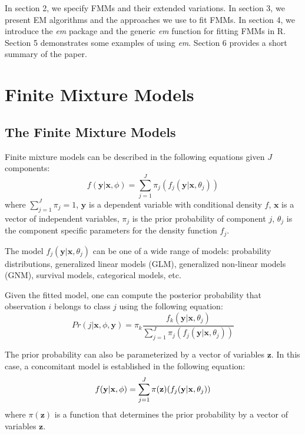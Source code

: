 \documentclass[nojss]{jss}
\begin{document}
In section 2, we specify FMMs and their extended variations. In section 3, we present EM algorithms and the approaches we use to fit FMMs. In section 4, we introduce the \emph{em} package and the generic \emph{em} function for fitting FMMs in R. Section 5 demonstrates some examples of using \emph{em}. Section 6 provides a short summary of the paper.   
   \section{Finite Mixture Models}
      \subsection{The Finite Mixture Models}
	      Finite mixture models can be described in the following equations given $J$ components:
      \begin{equation}
	      f(\mathbf{y}|\mathbf{x},\phi) = \sum_{j=1}^J \pi_j(f_j(\mathbf{y}|\mathbf{x}, \theta_j))
	    \end{equation}
	    where $\sum_{j=1}^J \pi_j = 1$,  $\mathbf{y}$ is a dependent variable with conditional density $f$,  $\mathbf{x}$ is a vector of independent variables, $\pi_j$ is the prior probability of component $j$,  $\theta_j$ is the component specific parameters for the density function $f_j$.

The model $f_j(\mathbf{y}|\mathbf{x}, \theta_j)$ can be one of a wide range of models: probability distributions, generalized linear models (GLM), generalized non-linear models (GNM),  survival models,  categorical models, etc. %

Given the fitted model, one can compute the posterior probability that observation $i$ belongs to class $j$ using the following equation:
\begin{equation}
    Pr(j|\mathbf{x}, \phi, \mathbf{y}) = \pi_k\frac{f_k(\mathbf{y}|\mathbf{x}, \theta_j)}{\sum_{j=1}^J \pi_j(f_j(\mathbf{y}|\mathbf{x}, \theta_j))}
\end{equation}

The prior probability can also be parameterized by a vector of variables $\mathbf{z}$. In this case, a concomitant model is established in the following equation:
    \begin{equation}
      f(\mathbf{y}|\mathbf{x},\phi) = \sum_{j=1}^J \pi(\mathbf{z})(f_j(\mathbf{y}|\mathbf{x}, \theta_j)) \\
    \end{equation}
where $\pi(\mathbf{z})$ is a function that determines the prior probability by a vector of variables $\mathbf{z}$.
\end{document}
